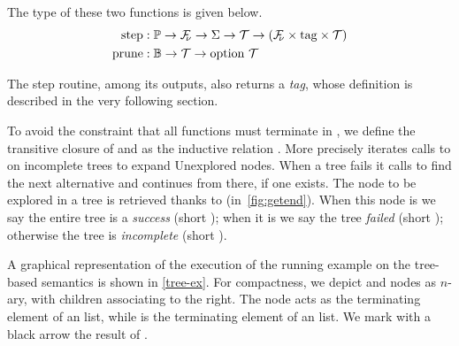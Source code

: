 \documentclass[sigplan,10pt,anonymous,review]{acmart}
\begin{document}
The type of these two functions is given below.
%
\begin{align*}
  \mathrm{step}  & : \mathbb{P} \to \mathcal{F}_{\!\!\nu} \to \Sigma \to \mathcal{T} \to (\mathcal{F}_{\!\!\nu}\times\mathrm{tag}\times\mathcal{T})\\
  \mathrm{prune} & : \mathbb{B} \to \mathcal{T} \to \mathrm{option}\ \mathcal{T}
\end{align*}

The step routine, among its outputs, also returns a \emph{tag}, whose definition
is described in the very following section.

To avoid the constraint that all functions must terminate in \rocqP{}, we define the transitive closure
of \step and \na as the inductive relation \run.
More precisely \run iterates calls to \step on incomplete trees to expand
Unexplored nodes. When a tree fails it calls \na to find
the next alternative and continues from there, if one exists.
The node to be explored in a tree is retrieved thanks to \pathend (in~\cref{fig:getend}).
When this node is \okC we say the entire tree is a \emph{success} (short \dingv);
when it is \koC we say the tree \emph{failed} (short \dingx); otherwise the tree is
\emph{incomplete} (short \dingss).


A graphical representation of the execution of the running example
on the tree-based semantics is shown in \cref{tree-ex}. For
compactness, we depict \andC and \orC nodes as $n$-ary,
with children associating to the right. The \koC node acts as the terminating
element of an \orC list, while \okC is the terminating element of an \andC
list. We mark with a black arrow the result of \pathend.





\end{document}
